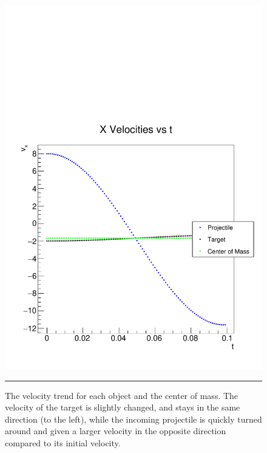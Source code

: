 \documentclass[aps,prl,floatfix,preprint,nofootinbib]{revtex4}
\begin{document}
\begin{figure}[floatfix]
  \includegraphics[width=.45\textwidth]{plots/out_c7/vx_vs_t.pdf}
                  {\par\nobreak\rule[9pt]{35em}{0.5pt}\vspace{-5mm}}
                  \caption{The velocity trend for each object and the center of mass. The velocity of the target is slightly changed, and stays in the same direction (to the left), while the incoming projectile is quickly turned around and given a larger velocity in the opposite direction compared to its initial velocity.}
                  \label{fig:vx_c7}
\end{figure}
\end{document}
